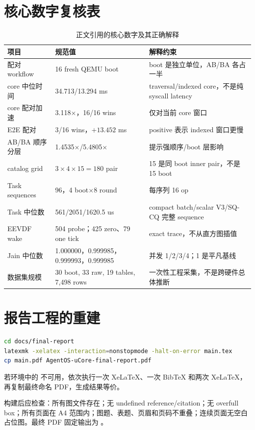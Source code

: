 \section{核心数字复核表}

\begin{table}[htbp]
  \centering
  \caption{正文引用的核心数字及其正确解释}
  \label{tab:canonical-numbers}
  \begin{tabularx}{\textwidth}{L{4.0cm}L{3.8cm}Y}
    \toprule
    项目 & 规范值 & 解释约束 \\
    \midrule
    配对 workflow & 16 fresh QEMU boot & boot 是独立单位，AB/BA 各占一半 \\
    core 中位时间 & 34.713/13.294 ms & traversal/indexed core，不是纯 syscall latency \\
    core 配对加速 & 3.118$\times$，16/16 wins & 仅对当前 core 窗口 \\
    E2E 配对 & 3/16 wins，$+13.452$ ms & positive 表示 indexed 窗口更慢 \\
    AB/BA 顺序分层 & 1.4535$\times$/5.4805$\times$ & 提示强顺序/boot 层影响 \\
    catalog grid & $3\times4\times15=180$ pair & 15 是同 boot inner pair，不是 15 boot \\
    Task sequences & 96，4 boot$\times$8 round & 每序列 16 op \\
    Task 中位数 & 561/2051/1620.5 us & compact batch/scalar V3/SQ-CQ 完整 sequence \\
    EEVDF wake & 504 probe；425 zero、79 one tick & exact trace，不从直方图插值 \\
    Jain 中位数 & 1.000000，0.999985，0.999993，0.999985 & 并发 1/2/3/4；1 是平凡基线 \\
    数据集规模 & 30 boot, 33 raw, 19 tables, 7,498 rows & 一次性工程采集，不是跨硬件总体推断 \\
    \bottomrule
  \end{tabularx}
\end{table}

\section{报告工程的重建}

\begin{lstlisting}[language=bash]
cd docs/final-report
latexmk -xelatex -interaction=nonstopmode -halt-on-error main.tex
cp main.pdf AgentOS-uCore-final-report.pdf
\end{lstlisting}

若环境中的  不可用，依次执行一次 XeLaTeX、一次 BibTeX 和两次
XeLaTeX，再复制最终命名 PDF，生成结果等价。

构建后应检查：所有图文件存在；无 undefined reference/citation；无 overfull box；所有页面在 A4 范围内；图题、表题、页眉和页码不重叠；连续页面无空白占位图。最终 PDF 固定输出为 。
